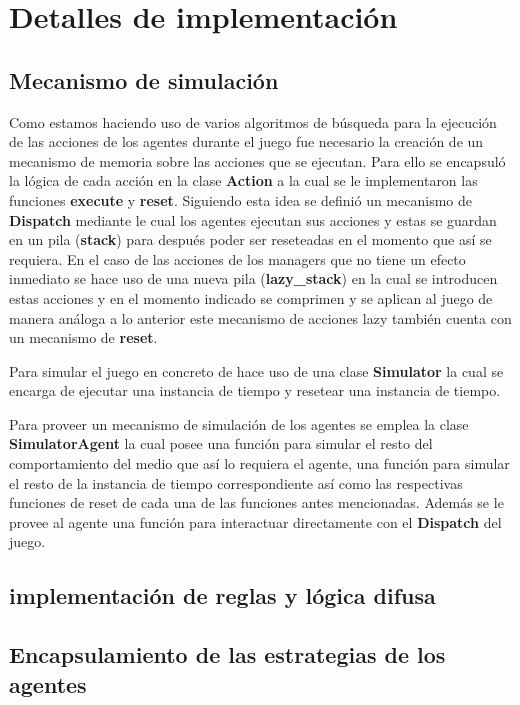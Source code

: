 \documentclass{article}
\begin{document}
\section{Detalles de implementación}

\subsection{Mecanismo de simulación}

Como estamos haciendo uso de varios algoritmos de búsqueda para la ejecución de las acciones de los agentes durante el juego
fue necesario la creación de un mecanismo de memoria sobre las acciones que se ejecutan. Para ello se encapsuló la lógica de cada 
acción en la clase \textbf{Action} a la cual se le implementaron las funciones \textbf{execute} y \textbf{reset}. Siguiendo esta idea se definió
un mecanismo de \textbf{Dispatch} mediante le cual los agentes ejecutan sus acciones y estas se guardan en un pila (\textbf{stack}) para después poder 
ser reseteadas en el momento que así se requiera. En el caso de las acciones de los managers que no tiene un efecto inmediato se hace 
uso de una nueva pila (\textbf{lazy\_stack}) en la cual se introducen estas acciones y en el momento indicado se comprimen y se aplican
al juego de manera análoga a lo anterior este mecanismo de acciones lazy también cuenta con un mecanismo de \textbf{reset}.

Para simular el juego en concreto de hace uso de una clase \textbf{Simulator} la cual se encarga de ejecutar una instancia de tiempo
y resetear una instancia de tiempo.

Para proveer un mecanismo de simulación de los agentes se emplea la clase \textbf{SimulatorAgent} la cual posee una función para simular 
el resto del comportamiento del medio que así lo requiera el agente, una función para simular el resto de la instancia de tiempo correspondiente
así como las respectivas funciones de reset de cada una de las funciones antes mencionadas. Además se le provee al agente una función para interactuar
directamente con el \textbf{Dispatch} del juego.

\subsection{implementación de reglas y lógica difusa}

\subsection{Encapsulamiento de las estrategias de los agentes}
\end{document}
